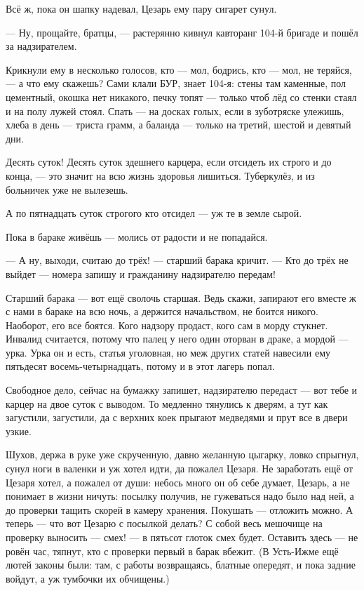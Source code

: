 Всё ж, пока он шапку надевал, Цезарь ему пару сигарет сунул.

--- Ну, прощайте, братцы, --- растерянно кивнул кавторанг 104-й бригаде и пошёл за надзирателем.

Крикнули ему в несколько голосов, кто --- мол, бодрись, кто --- мол, не теряйся, --- а что ему 
скажешь? Сами клали БУР, знает 104-я: стены там каменные, пол цементный, окошка нет никакого, 
печку топят --- только чтоб лёд со стенки стаял и на полу лужей стоял. Спать --- на досках голых, 
если в зуботряске улежишь, хлеба в день --- триста грамм, а баланда --- только на третий, шестой 
и девятый дни.

Десять суток! Десять суток здешнего карцера, если отсидеть их строго и до конца, --- это значит 
на всю жизнь здоровья лишиться. Туберкулёз, и из больничек уже не вылезешь.

А по пятнадцать суток строгого кто отсидел --- уж те в земле сырой.

Пока в бараке живёшь --- молись от радости и не попадайся.

--- А ну, выходи, считаю до трёх! --- старший барака кричит. --- Кто до трёх не выйдет --- номера 
запишу и гражданину надзирателю передам!

Старший барака --- вот ещё сволочь старшая. Ведь скажи, запирают его вместе ж с нами в бараке 
на всю ночь, а держится начальством, не боится никого. Наоборот, его все боятся. Кого надзору 
продаст, кого сам в морду стукнет. Инвалид считается, потому что палец у него один оторван в 
драке, а мордой --- урка. Урка он и есть, статья уголовная, но меж других статей навесили ему 
пятьдесят восемь-четырнадцать, потому и в этот лагерь попал.

Свободное дело, сейчас на бумажку запишет, надзирателю передаст --- вот тебе и карцер на двое 
суток с выводом. То медленно тянулись к дверям, а тут как загустили, загустили, да с верхних 
коек прыгают медведями и прут все в двери узкие.

Шухов, держа в руке уже скрученную, давно желанную цыгарку, ловко спрыгнул, сунул ноги в 
валенки и уж хотел идти, да пожалел Цезаря. Не заработать ещё от Цезаря хотел, а пожалел от 
души: небось много он об себе думает, Цезарь, а не понимает в жизни ничуть: посылку получив, не 
гужеваться надо было над ней, а до проверки тащить скорей в камеру хранения. Покушать --- 
отложить можно. А теперь --- что вот Цезарю с посылкой делать? С собой весь мешочище на 
проверку выносить --- смех! --- в пятьсот глоток смех будет. Оставить здесь --- не ровён час, 
тяпнут, кто с проверки первый в барак вбежит. (В Усть-Ижме ещё лютей законы были: там, с работы 
возвращаясь, блатные опередят, и пока задние войдут, а уж тумбочки их обчищены.)

